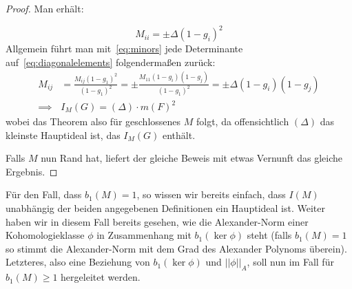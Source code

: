 \begin{proof}
	Man erhält:
	
	\begin{equation}
		M_{ii}= \pm \Delta (1-g_i)^2 \label{eq:diagonalelements}
	\end{equation}
	Allgemein führt man mit~\eqref{eq:minors} jede Determinante auf~\eqref{eq:diagonalelements} folgendermaßen zurück:
	\begin{align}
		M_{ij} &= \frac{M_{ij}(1-g_1)^2}{(1-g_1)^2} 
				= \pm \frac{M_{11}(1-g_i)(1-g_j)}{(1-g_1)^2}
				= \pm \Delta (1-g_i)(1-g_j)\\
		\implies &I_M(G) = (\Delta) \cdot m(F)^2 
	\end{align}
	wobei das Theorem also für geschlossenes $M$ folgt, da offensichtlich $(\Delta)$ das kleinste Hauptideal ist, das $I_M(G)$ enthält.

	Falls $M$ nun Rand hat, liefert der gleiche Beweis mit etwas Vernunft das gleiche Ergebnis. 
\end{proof} 

Für den Fall, dass $b_1(M)=1$, so wissen wir bereits einfach, dass $I(M)$ unabhängig der beiden angegebenen Definitionen ein Hauptideal ist. Weiter haben wir in diesem Fall bereits gesehen, wie die Alexander-Norm einer Kohomologieklasse $\phi$ in Zusammenhang mit $b_1(\ker \phi)$ steht (falls $b_1(M)=1$ so stimmt die Alexander-Norm mit dem Grad des Alexander Polynoms überein). Letzteres, also eine Beziehung von $b_1(\ker\phi)$ und $||\phi||_A$, soll nun im Fall für $b_1(M)\geq 1$ hergeleitet werden.

